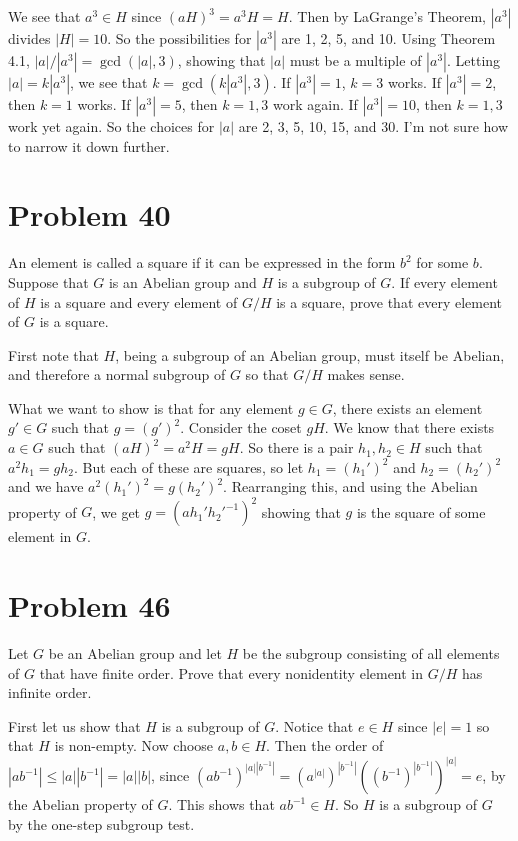 \documentclass{article}
\begin{document}
We see that $a^3\in H$ since $(aH)^3=a^3H=H$.  Then by LaGrange's Theorem,
$|a^3|$ divides $|H|=10$.  So the possibilities for $|a^3|$ are 1, 2, 5,
and 10.  Using Theorem 4.1, $|a|/|a^3|=\gcd(|a|,3)$, showing that $|a|$
must be a multiple of $|a^3|$.  Letting $|a|=k|a^3|$, we see that
$k=\gcd(k|a^3|,3)$.  If $|a^3|=1$, $k=3$ works.  If $|a^3|=2$, then
$k=1$ works.  If $|a^3|=5$, then $k=1,3$ work again.  If $|a^3|=10$,
then $k=1,3$ work yet again.  So the choices for $|a|$ are 2, 3, 5,
10, 15, and 30.  I'm not sure how to narrow it down further.

\section*{Problem 40}

An element is called a square if it can be expressed in the form $b^2$
for some $b$.  Suppose that $G$ is an Abelian group and $H$ is a subgroup
of $G$.  If every element of $H$ is a square and every element of $G/H$
is a square, prove that every element of $G$ is a square.

First note that $H$, being a subgroup of an Abelian group, must itself
be Abelian, and therefore a normal subgroup of $G$ so that $G/H$ makes sense.

What we want to show is that for any element $g\in G$, there exists an
element $g'\in G$ such that $g=(g')^2$.  Consider the coset $gH$.  We know
that there exists $a\in G$ such that $(aH)^2=a^2H=gH$.  So there is a pair
$h_1,h_2\in H$ such that $a^2h_1=gh_2$.  But each of these are squares,
so let $h_1=(h_1')^2$ and $h_2=(h_2')^2$ and we have $a^2(h_1')^2=g(h_2')^2$.
Rearranging this, and using the Abelian property of $G$, we get
$g = (ah_1'h_2'^{-1})^2$ showing that $g$ is the square of some element in $G$.

\section*{Problem 46}

Let $G$ be an Abelian group and let $H$ be the subgroup consisting of all
elements of $G$ that have finite order.  Prove that every nonidentity element
in $G/H$ has infinite order.

First let us show that $H$ is a subgroup of $G$.  Notice that $e\in H$ since $|e|=1$
so that $H$ is non-empty.  Now choose $a,b\in H$.
Then the order of $|ab^{-1}|\leq|a||b^{-1}|=|a||b|$, since
$(ab^{-1})^{|a||b^{-1}|}=(a^{|a|})^{|b^{-1}|}((b^{-1})^{|b^{-1}|})^{|a|}=e$, by
the Abelian property of $G$.  This shows that $ab^{-1}\in H$.
So $H$ is a subgroup of $G$ by the one-step subgroup test.
\end{document}
